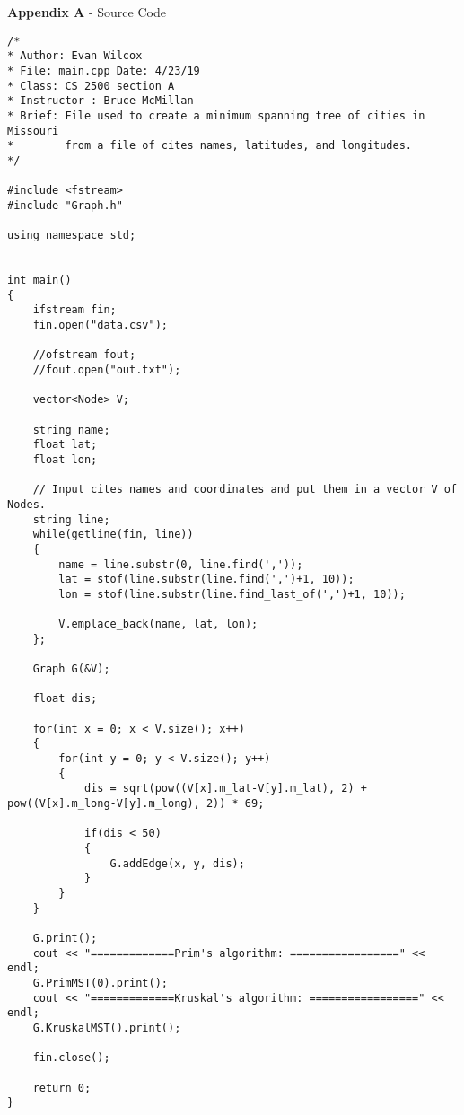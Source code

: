 \documentclass[a4paper]{article}
\begin{document}
    \newpage
    \textbf{Appendix A} - Source Code
    \begin{verbatim}
/*
* Author: Evan Wilcox
* File: main.cpp Date: 4/23/19
* Class: CS 2500 section A
* Instructor : Bruce McMillan
* Brief: File used to create a minimum spanning tree of cities in Missouri
*        from a file of cites names, latitudes, and longitudes.
*/

#include <fstream>
#include "Graph.h"

using namespace std;


int main()
{
    ifstream fin;
    fin.open("data.csv");

    //ofstream fout;
    //fout.open("out.txt");

    vector<Node> V;

    string name;
    float lat;
    float lon;

    // Input cites names and coordinates and put them in a vector V of Nodes.
    string line;
    while(getline(fin, line))
    {
        name = line.substr(0, line.find(','));
        lat = stof(line.substr(line.find(',')+1, 10));
        lon = stof(line.substr(line.find_last_of(',')+1, 10));
        
        V.emplace_back(name, lat, lon);
    };

    Graph G(&V);

    float dis;

    for(int x = 0; x < V.size(); x++)
    {
        for(int y = 0; y < V.size(); y++)
        {
            dis = sqrt(pow((V[x].m_lat-V[y].m_lat), 2) + pow((V[x].m_long-V[y].m_long), 2)) * 69;

            if(dis < 50)
            {
                G.addEdge(x, y, dis);
            }
        }
    } 

    G.print();
    cout << "=============Prim's algorithm: =================" << endl;
    G.PrimMST(0).print();
    cout << "=============Kruskal's algorithm: =================" << endl;
    G.KruskalMST().print();

    fin.close();

    return 0;
}
    \end{verbatim}
\end{document}
